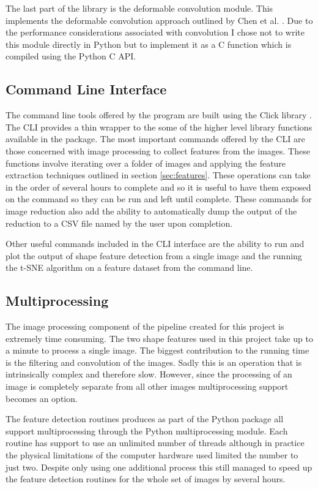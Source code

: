The last part of the library is the deformable convolution module. This implements the deformable convolution approach outlined by Chen et al. \cite{chen2013multiscale}. Due to the performance considerations associated with convolution I chose not to write this module directly in Python but to implement it as a C function which is compiled using the Python C API.

\subsection{Command Line Interface}
The command line tools offered by the program are built using the Click library \cite{clickLibrary}. The CLI provides a thin wrapper to the some of the higher level library functions available in the package. The most important commands offered by the CLI are those concerned with image processing to collect features from the images. These functions involve iterating over a folder of images and applying the feature extraction techniques outlined in section  \ref{sec:features}. These operations can take in the order of several hours to complete and so it is useful to have them exposed on the command so they can be run and left until complete. These commands for image reduction also add the ability to automatically dump the output of the reduction to a CSV file named by the user upon completion. 

Other useful commands included in the CLI interface are the ability to run and plot the output of shape feature detection from a single image and the running the t-SNE algorithm on a feature dataset from the command line.

\subsection{Multiprocessing}
The image processing component of the pipeline created for this project is extremely time consuming. The two shape features used in this project take up to a minute to process a single image. The biggest contribution to the running time is the filtering and convolution of the images. Sadly this is an operation that is intrinsically complex and therefore slow. However, since the processing of an image is completely separate from all other images multiprocessing support becomes an option. 

The feature detection routines produces as part of the Python package all support multiprocessing through the Python multiprocessing module. Each routine has support to use an unlimited number of threads although in practice the physical limitations of the computer hardware used limited the number to just two. Despite only using one additional process this still managed to speed up the feature detection routines for the whole set of images by several hours.



